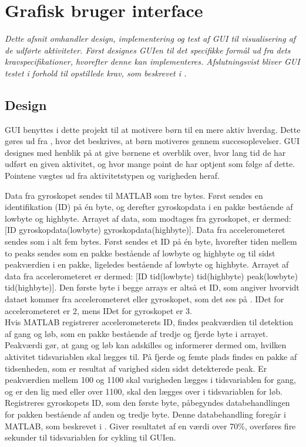 \section{Grafisk bruger interface}\label{GUI_design}
\textit{Dette afsnit omhandler design, implementering og test af GUI til visualisering af de udførte aktiviteter. Først designes GUIen til det specifikke formål ud fra dets kravspecifikationer, hvorefter denne kan implementeres. Afslutningsvist bliver GUI testet i forhold til opstillede krav, som beskrevet i .}

\subsection{Design}
GUI benyttes i dette projekt til at motivere børn til en mere aktiv hverdag. Dette gøres ud fra , hvor det beskrives, at børn motiveres gennem succesoplevelser. GUI designes med henblik på at give børnene et overblik over, hvor lang tid de har udført en given aktivitet, og hvor mange point de har optjent som følge af dette. Pointene vægtes ud fra aktivitetstypen og varigheden heraf. 

Data fra gyroskopet sendes til MATLAB som tre bytes. Først sendes en identifikation (ID) på én byte, og derefter gyroskopdata i en pakke bestående af lowbyte og highbyte. Arrayet af data, som modtages fra gyroskopet, er dermed: [ID gyroskopdata(lowbyte) gyroskopdata(highbyte)]. Data fra accelerometeret sendes som i alt fem bytes. Først sendes et ID på én byte, hvorefter tiden mellem to peaks sendes som en pakke bestående af lowbyte og highbyte og til sidst peakværdien i en pakke, ligeledes bestående af lowbyte og highbyte. Arrayet af data fra accelerometeret er dermed: [ID tid(lowbyte) tid(highbyte) peak(lowbyte) tid(highbyte)]. Den første byte i begge arrays er altså et ID, som angiver hvorvidt dataet kommer fra accelerometeret eller gyroskopet, som det ses på . IDet for accelerometeret er 2, mens IDet for gyroskopet er 3.\\
Hvis MATLAB registrerer accelerometerets ID, findes peakværdien til detektion af gang og løb, som en pakke bestående af tredje og fjerde byte i arrayet. Peakværdi gør, at gang og løb kan adskilles og informerer dermed om, hvilken aktivitet tidsvariablen skal lægges til. På fjerde og femte plads findes en pakke af tidsenheden, som er resultat af varighed siden sidst detekterede peak. Er peakværdien mellem 100 og 1100 skal varigheden lægges i tidsvariablen for gang, og er den lig med eller over 1100, skal den lægges over i tidsvariablen for løb.\\
Registreres gyroskopets ID, som den første byte, påbegyndes databehandlingen for pakken bestående af anden og tredje byte. Denne databehandling foregår i MATLAB, som beskrevet i . Giver resultatet af en værdi over 70\%, overføres fire sekunder til tidsvariablen for cykling til GUIen.\\ 


